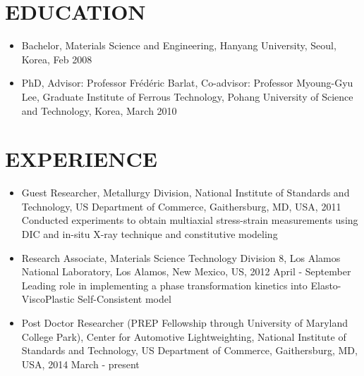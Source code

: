 \documentclass{res}
\begin{document}
 


\address{\bf Center for Automotive Lightweighting \\
  \bf National Institute of Standards and Technology \\
  \bf US Department of Commerce \\
  \bf 100 Bureau Drive Stop 8553, \\
  \bf Gaithersburg, MD, US \\
  \bf zip: 20899-8553
  \bf +1 (301) 975-5028,  youngung.jeong@nist.gov}

\begin{resume}
  \section{EDUCATION}
  \begin{itemize}
  \item Bachelor, Materials Science and Engineering, Hanyang University, Seoul, Korea, Feb 2008
  \item PhD, Advisor: Professor Fr\'ed\'eric Barlat, Co-advisor: Professor Myoung-Gyu Lee, Graduate Institute of Ferrous Technology, Pohang University of Science and Technology, Korea, March 2010 
  \end{itemize}

  \section{EXPERIENCE}
  \begin{itemize}
  \item Guest Researcher, Metallurgy Division, National Institute of
    Standards and Technology, US Department of Commerce, Gaithersburg,
    MD, USA, 2011\\
    Conducted experiments to obtain multiaxial stress-strain measurements
    using DIC and in-situ X-ray technique and constitutive modeling
  \item Research Associate, Materials Science Technology Division 8, Los Alamos
    National Laboratory, Los Alamos, New Mexico, US, 2012 April - September \\ 
    Leading role in implementing a phase transformation kinetics into Elasto-ViscoPlastic Self-Consistent model
  \item Post Doctor Researcher (PREP Fellowship through University of Maryland College Park), Center for Automotive Lightweighting,
    National Institute of Standards and Technology, US Department of Commerce, Gaithersburg, MD, USA, 2014 March - present
    \\
  \end{itemize}


\end{resume}
\end{document}
